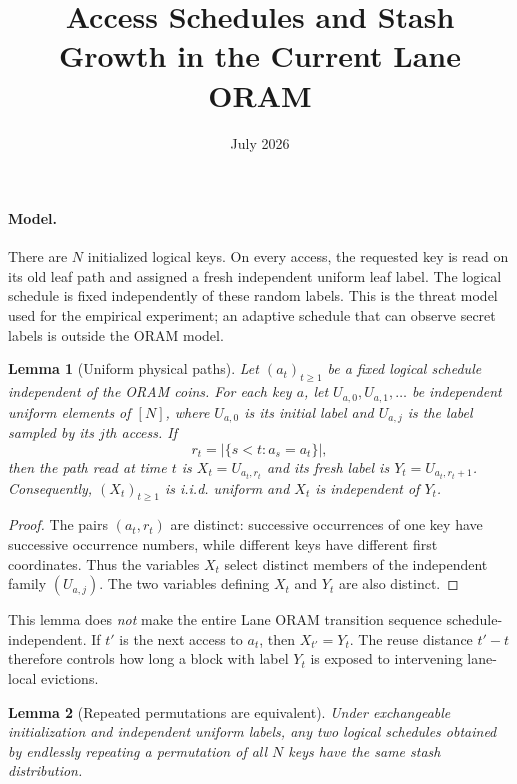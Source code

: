 \documentclass[11pt]{article}
\title{Access Schedules and Stash Growth in the Current Lane ORAM}
\author{}
\date{July 2026}
\newtheorem{lemma}{Lemma}
\begin{document}
\maketitle

\paragraph{Model.}
There are $N$ initialized logical keys.  On every access, the requested key is
read on its old leaf path and assigned a fresh independent uniform leaf label.
The logical schedule is fixed independently of these random labels.  This is
the threat model used for the empirical experiment; an adaptive schedule that
can observe secret labels is outside the ORAM model.

\begin{lemma}[Uniform physical paths]
Let $(a_t)_{t\geq 1}$ be a fixed logical schedule independent of the ORAM
coins.  For each key $a$, let
$U_{a,0},U_{a,1},\ldots$ be independent uniform elements of $[N]$, where
$U_{a,0}$ is its initial label and $U_{a,j}$ is the label sampled by its $j$th
access.  If
\[
  r_t=\left|\{s<t:a_s=a_t\}\right|,
\]
then the path read at time $t$ is $X_t=U_{a_t,r_t}$ and its fresh label is
$Y_t=U_{a_t,r_t+1}$.  Consequently, $(X_t)_{t\geq1}$ is i.i.d. uniform and
$X_t$ is independent of $Y_t$.
\end{lemma}

\begin{proof}
The pairs $(a_t,r_t)$ are distinct: successive occurrences of one key have
successive occurrence numbers, while different keys have different first
coordinates.  Thus the variables $X_t$ select distinct members of the
independent family $(U_{a,j})$.  The two variables defining $X_t$ and $Y_t$
are also distinct.
\end{proof}

This lemma does \emph{not} make the entire Lane ORAM transition sequence
schedule-independent.  If $t'$ is the next access to $a_t$, then
$X_{t'}=Y_t$.  The reuse distance $t'-t$ therefore controls how long a block
with label $Y_t$ is exposed to intervening lane-local evictions.

\begin{lemma}[Repeated permutations are equivalent]
Under exchangeable initialization and independent uniform labels, any two
logical schedules obtained by endlessly repeating a permutation of all $N$
keys have the same stash distribution.
\end{lemma}
\end{document}
